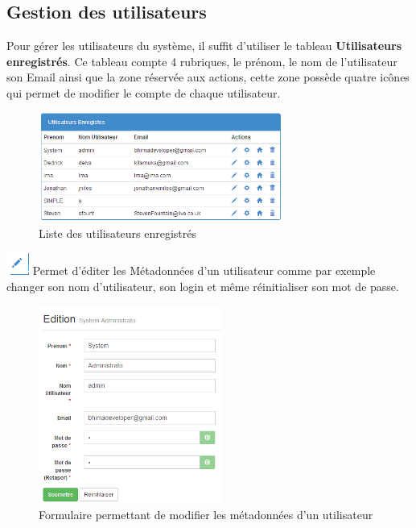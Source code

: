 \documentclass[12pt,a4paper]{report}
\begin{document}
\subsection{Gestion des utilisateurs}
Pour gérer les utilisateurs du système, il suffit d'utiliser le tableau \textbf{Utilisateurs enregistrés}. Ce tableau compte 4 rubriques, le prénom, le nom de l'utilisateur son Email ainsi que la zone réservée aux actions, cette zone possède quatre icônes qui permet de modifier le compte de chaque utilisateur.
\begin{figure}[h]
\begin{center}
\includegraphics[width=8cm]{pic/ListUser.png}
\end{center}
\caption{Liste des utilisateurs enregistrés}
\label{Liste des utilisateurs enregistrés}
\end{figure}
 \includegraphics[scale=1]{pic/EditUser.png} Permet d'éditer les Métadonnées d'un utilisateur comme par exemple changer son nom d'utilisateur, son login et même réinitialiser son mot de passe.
 \begin{figure}[h]
\begin{center}
\includegraphics[width=6cm]{pic/UpdateUser.png}
\end{center}
\caption{Formulaire permettant de modifier les métadonnées d'un utilisateur}
\label{Formulaire permettant de modifier les métadonnées d'un utilisateur}
\end{figure}
\end{document}

